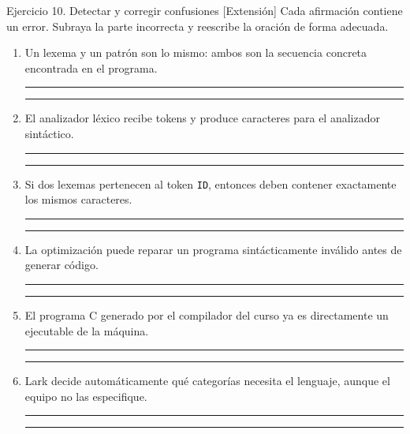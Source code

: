 \documentclass[11pt,spanish]{article}
\newcommand{\blank}[1][4cm]{\rule{#1}{0.4pt}}
\begin{document}
\ifrespuestas\else\newpage\fi
\begin{ejercicio}{Ejercicio 10. Detectar y corregir confusiones \hfill {\small [Extensión]}}
Cada afirmación contiene un error. Subraya la parte incorrecta y reescribe la oración de forma adecuada.

\begin{enumerate}[leftmargin=*]
    \item Un lexema y un patrón son lo mismo: ambos son la secuencia concreta encontrada en el programa.

    \ifrespuestas\else
    \blank[14cm]

    \blank[14cm]
    \fi

    \item El analizador léxico recibe tokens y produce caracteres para el analizador sintáctico.

    \ifrespuestas\else
    \blank[14cm]

    \blank[14cm]
    \fi

    \item Si dos lexemas pertenecen al token \texttt{ID}, entonces deben contener exactamente los mismos caracteres.

    \ifrespuestas\else
    \blank[14cm]

    \blank[14cm]
    \fi

    \item La optimización puede reparar un programa sintácticamente inválido antes de generar código.

    \ifrespuestas\else
    \blank[14cm]

    \blank[14cm]
    \fi

    \item El programa \textsc{C} generado por el compilador del curso ya es directamente un ejecutable de la máquina.

    \ifrespuestas\else
    \blank[14cm]

    \blank[14cm]
    \fi

    \item Lark decide automáticamente qué categorías necesita el lenguaje, aunque el equipo no las especifique.

    \ifrespuestas\else
    \blank[14cm]

    \blank[14cm]
    \fi
\end{enumerate}
\end{ejercicio}
\end{document}
